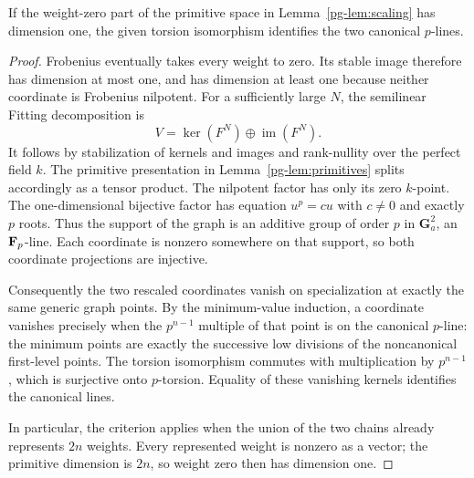 \begin{lemma}\label{pg-lem:zero-weight}
If the weight-zero part of the primitive space in Lemma~\ref{pg-lem:scaling} has dimension one, the given torsion isomorphism identifies the two canonical $p$-lines.
\end{lemma}
\begin{proof}
Frobenius eventually takes every weight to zero. Its stable image therefore has dimension at most one, and has dimension at least one because neither coordinate is Frobenius nilpotent. For a sufficiently large $N$, the semilinear Fitting decomposition is
\[
 V=\ker(F^N)\oplus\operatorname{im}(F^N).
\]
It follows by stabilization of kernels and images and rank-nullity over the perfect field $k$. The primitive presentation in Lemma~\ref{pg-lem:primitives} splits accordingly as a tensor product. The nilpotent factor has only its zero $k$-point. The one-dimensional bijective factor has equation $u^p=cu$ with $c\ne0$ and exactly $p$ roots. Thus the support of the graph is an additive group of order $p$ in $\mathbf G_a^2$, an $\mathbf F_p$-line. Each coordinate is nonzero somewhere on that support, so both coordinate projections are injective.

Consequently the two rescaled coordinates vanish on specialization at exactly the same generic graph points. By the minimum-value induction, a coordinate vanishes precisely when the $p^{n-1}$ multiple of that point is on the canonical $p$-line: the minimum points are exactly the successive low divisions of the noncanonical first-level points. The torsion isomorphism commutes with multiplication by $p^{n-1}$, which is surjective onto $p$-torsion. Equality of these vanishing kernels identifies the canonical lines.

In particular, the criterion applies when the union of the two chains already represents $2n$ weights. Every represented weight is nonzero as a vector; the primitive dimension is $2n$, so weight zero then has dimension one.
\end{proof}

